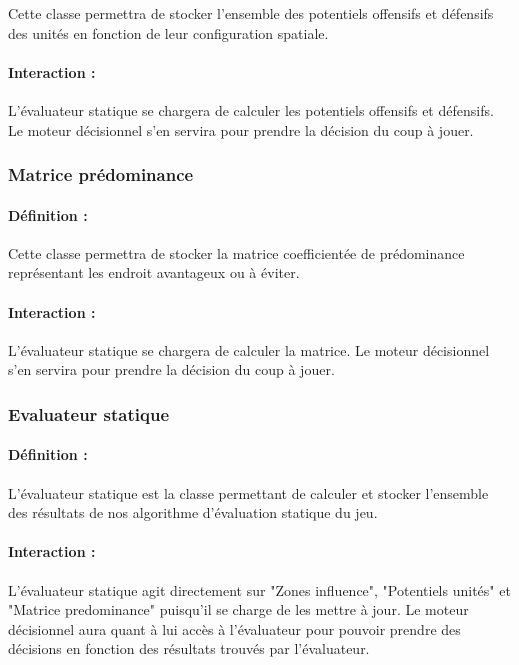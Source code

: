 \documentclass[12pt]{article}
\begin{document}
				Cette classe permettra de stocker l'ensemble des potentiels offensifs et défensifs des unités en fonction de leur configuration spatiale.

				\paragraph{Interaction :}

				L'évaluateur statique se chargera de calculer les potentiels offensifs et défensifs. Le moteur décisionnel s'en servira pour prendre la décision du coup à jouer.

			\subsubsection{Matrice prédominance}

				\paragraph{Définition :}

				Cette classe permettra de stocker la matrice coefficientée de prédominance représentant les endroit avantageux ou à éviter.

				\paragraph{Interaction :}

				L'évaluateur statique se chargera de calculer la matrice. Le moteur décisionnel s'en servira pour prendre la décision du coup à jouer.

			\subsubsection{Evaluateur statique}

				\paragraph{Définition :}

				L'évaluateur statique est la classe permettant de calculer et stocker l'ensemble des résultats de nos algorithme d'évaluation statique du jeu.

				\paragraph{Interaction :}

				L'évaluateur statique agit directement sur "Zones influence", "Potentiels unités" et "Matrice predominance" puisqu'il se charge de les mettre à jour. Le moteur décisionnel aura quant à lui accès à l'évaluateur pour pouvoir prendre des décisions en fonction des résultats trouvés par l'évaluateur.
\end{document}
